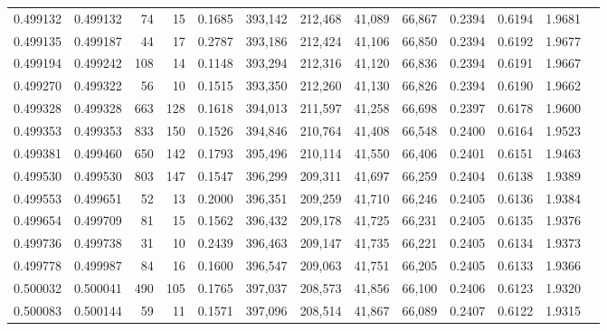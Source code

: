 \begin{tabular}{rrrrrrrrrrrrr}
0.499132 & 0.499132 &    74 &    15 &                                     0.1685 & 393,142 & 212,468 &  41,089 &  66,867 & 0.2394 & 0.6194 & 1.9681 \\
0.499135 & 0.499187 &    44 &    17 &                                     0.2787 & 393,186 & 212,424 &  41,106 &  66,850 & 0.2394 & 0.6192 & 1.9677 \\
0.499194 & 0.499242 &   108 &    14 &                                     0.1148 & 393,294 & 212,316 &  41,120 &  66,836 & 0.2394 & 0.6191 & 1.9667 \\
0.499270 & 0.499322 &    56 &    10 &                                     0.1515 & 393,350 & 212,260 &  41,130 &  66,826 & 0.2394 & 0.6190 & 1.9662 \\
0.499328 & 0.499328 &   663 &   128 &                                     0.1618 & 394,013 & 211,597 &  41,258 &  66,698 & 0.2397 & 0.6178 & 1.9600 \\
0.499353 & 0.499353 &   833 &   150 &                                     0.1526 & 394,846 & 210,764 &  41,408 &  66,548 & 0.2400 & 0.6164 & 1.9523 \\
0.499381 & 0.499460 &   650 &   142 &                                     0.1793 & 395,496 & 210,114 &  41,550 &  66,406 & 0.2401 & 0.6151 & 1.9463 \\
0.499530 & 0.499530 &   803 &   147 &                                     0.1547 & 396,299 & 209,311 &  41,697 &  66,259 & 0.2404 & 0.6138 & 1.9389 \\
0.499553 & 0.499651 &    52 &    13 &                                     0.2000 & 396,351 & 209,259 &  41,710 &  66,246 & 0.2405 & 0.6136 & 1.9384 \\
0.499654 & 0.499709 &    81 &    15 &                                     0.1562 & 396,432 & 209,178 &  41,725 &  66,231 & 0.2405 & 0.6135 & 1.9376 \\
0.499736 & 0.499738 &    31 &    10 &                                     0.2439 & 396,463 & 209,147 &  41,735 &  66,221 & 0.2405 & 0.6134 & 1.9373 \\
0.499778 & 0.499987 &    84 &    16 &                                     0.1600 & 396,547 & 209,063 &  41,751 &  66,205 & 0.2405 & 0.6133 & 1.9366 \\
0.500032 & 0.500041 &   490 &   105 &                                     0.1765 & 397,037 & 208,573 &  41,856 &  66,100 & 0.2406 & 0.6123 & 1.9320 \\
0.500083 & 0.500144 &    59 &    11 &                                     0.1571 & 397,096 & 208,514 &  41,867 &  66,089 & 0.2407 & 0.6122 & 1.9315 \\

\end{tabular}
